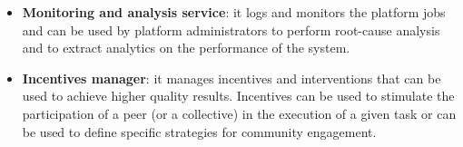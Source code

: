 \begin{itemize}
\item {\bf Monitoring and analysis service}: it logs and monitors the platform jobs and can be used by platform administrators to perform root-cause analysis and to extract analytics on the performance of the system. 

\item {\bf Incentives manager}: it manages incentives and
interventions that can be used to achieve higher quality results. Incentives %
can be used to stimulate the participation of a peer (or a collective) in the execution of a given task 
or can be used to define specific strategies for community engagement. %
\end{itemize} 	







